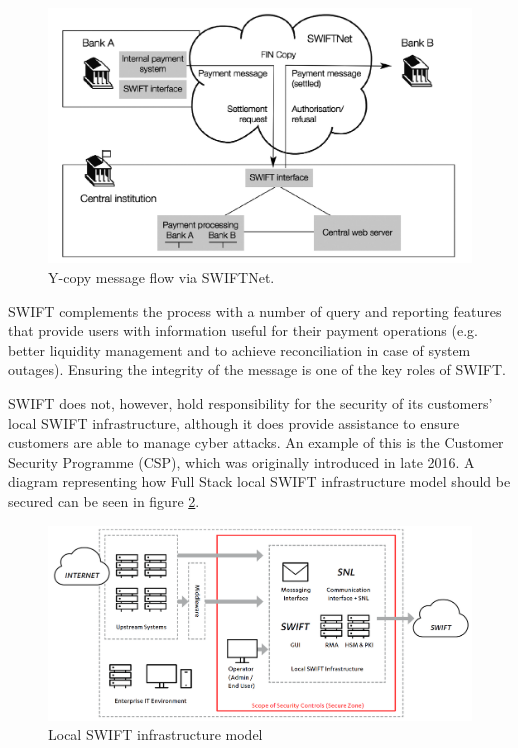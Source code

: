 \documentclass[12pt]{article}
\begin{document}
        \begin{figure}[H]
        \centering
        \includegraphics[width=\textwidth]{figures/swiftcloud.png}
        \caption{Y-copy message flow via SWIFTNet.}
        \label{fig:swiftcloud}
        \end{figure}
       
        SWIFT complements the process with a number of query and reporting features that provide users with information useful for their payment operations (e.g. better liquidity management and to achieve reconciliation in case of system outages). Ensuring the integrity of the message is one of the key roles of SWIFT.\cite{scottSocietyWorldwideInterbank2013}
        
        SWIFT does not, however, hold responsibility for the security of its customers’ local SWIFT infrastructure, although it does provide assistance to ensure customers are able to manage cyber attacks. An example of this is the Customer Security Programme (CSP), which was originally introduced in late 2016. A diagram representing how  Full Stack local SWIFT infrastructure model should be secured can be seen in figure \ref{fig:Swift}.
        
        \begin{figure}[H]
        \centering
        \includegraphics[width=\textwidth]{figures/swift.png}
        \caption{Local SWIFT infrastructure model}
        \label{fig:Swift}
        \end{figure}
        
\end{document}
